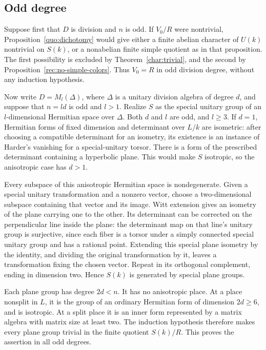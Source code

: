\subsection{Odd degree}

Suppose first that $D$ is division and $n$ is odd.  If $V_0/R$ were
nontrivial, Proposition~\ref{quo:dichotomy} would give either a finite
abelian character of $U(k)$ nontrivial on $S(k)$, or a nonabelian finite
simple quotient as in that proposition.  The first possibility is
excluded by Theorem~\ref{char:trivial}, and the second by
Proposition~\ref{rec:no-simple-colors}.  Thus $V_0=R$ in odd division degree,
without any induction hypothesis.

Now write $D=M_l(\Delta)$, where $\Delta$ is a unitary division algebra
of degree $d$, and suppose that $n=ld$ is odd and $l>1$.  Realize $S$ as
the special unitary group of an $l$-dimensional Hermitian space over
$\Delta$.  Both $d$ and $l$ are odd, and $l\geq3$.  If $d=1$, Hermitian
forms of fixed dimension and determinant over $L/k$ are isometric:
after choosing a compatible determinant for an isometry, its existence
is an instance of Harder's vanishing for a special-unitary torsor.
There is a form of the prescribed determinant containing a hyperbolic
plane.  This would make $S$ isotropic, so the anisotropic case has $d>1$.

Every subspace of this anisotropic Hermitian space is nondegenerate.
Given a special unitary transformation and a nonzero vector, choose a
two-dimensional subspace containing that vector and its image.  Witt
extension gives an isometry of the plane carrying one to the other.
Its determinant can be corrected on the perpendicular line inside the
plane: the determinant map on that line's unitary group is surjective,
since each fiber is a torsor under a simply connected special unitary
group and has a rational point.  Extending this special plane isometry
by the identity, and dividing the original transformation by it, leaves
a transformation fixing the chosen vector.  Repeat in its orthogonal
complement, ending in dimension two.  Hence $S(k)$ is generated by
special plane groups.

Each plane group has degree $2d<n$.  It has no anisotropic place.  At a
place nonsplit in $L$, it is the group of an ordinary Hermitian form of
dimension $2d\geq6$, and is isotropic.  At a split place it is an inner
form represented by a matrix algebra with matrix size at least two.
The induction hypothesis therefore makes every plane group trivial in
the finite quotient $S(k)/R$.  This proves the assertion in all odd
degrees.

